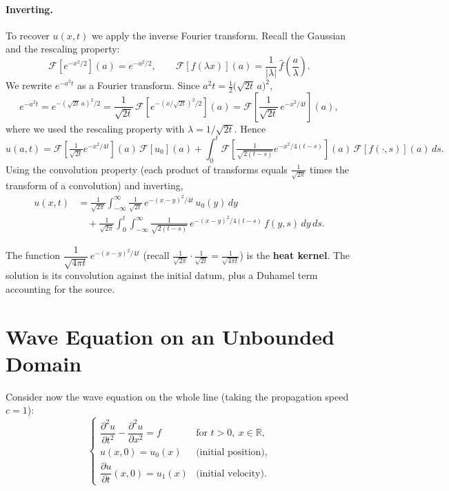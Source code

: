 \paragraph{Inverting.}
To recover $u(x, t)$ we apply the inverse Fourier transform. Recall the Gaussian and the rescaling property:
\[
\mathcal{F}[e^{-x^2/2}](a) = e^{-a^2/2}, \qquad
\mathcal{F}[f(\lambda x)](a) = \frac{1}{|\lambda|}\,\hat{f}\!\left(\frac{a}{\lambda}\right).
\]
We rewrite $e^{-a^2 t}$ as a Fourier transform. Since $a^2 t = \tfrac{1}{2}\bigl(\sqrt{2t}\,a\bigr)^2$,
\[
e^{-a^2 t} = e^{-(\sqrt{2t}\,a)^2/2}
= \frac{1}{\sqrt{2t}}\,\mathcal{F}\!\left[e^{-(x/\sqrt{2t})^2/2}\right](a)
= \mathcal{F}\!\left[\frac{1}{\sqrt{2t}}\,e^{-x^2/4t}\right](a),
\]
where we used the rescaling property with $\lambda = 1/\sqrt{2t}$. Hence
\[
\hat{u}(a, t) = \mathcal{F}\!\left[\tfrac{1}{\sqrt{2t}}e^{-x^2/4t}\right](a)\,\mathcal{F}[u_0](a)
+ \int_0^t \mathcal{F}\!\left[\tfrac{1}{\sqrt{2(t - s)}}e^{-x^2/4(t - s)}\right](a)\,\mathcal{F}[f(\cdot, s)](a)\,ds.
\]
Using the convolution property (each product of transforms equals $\tfrac{1}{\sqrt{2\pi}}$ times the transform of a convolution) and inverting,
\[
\boxed{
\begin{aligned}
u(x, t) &= \frac{1}{\sqrt{2\pi}}\int_{-\infty}^{\infty} \frac{1}{\sqrt{2t}}\,e^{-(x - y)^2/4t}\,u_0(y)\,dy \\
&\quad + \frac{1}{\sqrt{2\pi}}\int_0^t\int_{-\infty}^{\infty} \frac{1}{\sqrt{2(t - s)}}\,e^{-(x - y)^2/4(t - s)}\,f(y, s)\,dy\,ds.
\end{aligned}}
\]

\begin{remark}
The function $\dfrac{1}{\sqrt{4\pi t}}\,e^{-(x - y)^2/4t}$ (recall $\tfrac{1}{\sqrt{2\pi}}\cdot\tfrac{1}{\sqrt{2t}} = \tfrac{1}{\sqrt{4\pi t}}$) is the \textbf{heat kernel}. The solution is its convolution against the initial datum, plus a Duhamel term accounting for the source.
\end{remark}

\section{Wave Equation on an Unbounded Domain}

Consider now the wave equation on the whole line (taking the propagation speed $c = 1$):
\[
\begin{cases}
\dfrac{\partial^2 u}{\partial t^2} - \dfrac{\partial^2 u}{\partial x^2} = f & \text{for } t > 0,\ x \in \mathbb{R}, \\[2pt]
u(x, 0) = u_0(x) & \text{(initial position),} \\[2pt]
\dfrac{\partial u}{\partial t}(x, 0) = u_1(x) & \text{(initial velocity).}
\end{cases}
\]

